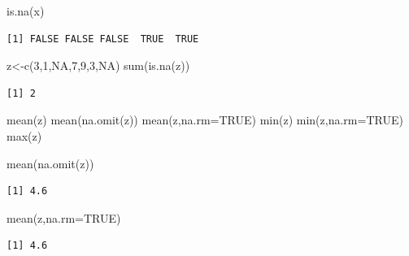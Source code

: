 \documentclass[
  ignorenonframetext,
  aspectratio=169,
  spanish,
]{beamer}
\newenvironment{Shaded}{\begin{snugshade}}{\end{snugshade}}
\newcommand{\AttributeTok}[1]{\textcolor[rgb]{0.40,0.45,0.13}{#1}}
\newcommand{\ConstantTok}[1]{\textcolor[rgb]{0.56,0.35,0.01}{#1}}
\newcommand{\DecValTok}[1]{\textcolor[rgb]{0.68,0.00,0.00}{#1}}
\newcommand{\FunctionTok}[1]{\textcolor[rgb]{0.28,0.35,0.67}{#1}}
\newcommand{\NormalTok}[1]{\textcolor[rgb]{0.00,0.23,0.31}{#1}}
\newcommand{\OtherTok}[1]{\textcolor[rgb]{0.00,0.23,0.31}{#1}}
\begin{document}
\begin{frame}[fragile]{}
\label{section-7}
\begin{Shaded}
\begin{Highlighting}[]
\FunctionTok{is.na}\NormalTok{(x)}
\end{Highlighting}
\end{Shaded}

\begin{verbatim}
[1] FALSE FALSE FALSE  TRUE  TRUE
\end{verbatim}

\begin{Shaded}
\begin{Highlighting}[]
\NormalTok{z}\OtherTok{\textless{}{-}}\FunctionTok{c}\NormalTok{(}\DecValTok{3}\NormalTok{,}\DecValTok{1}\NormalTok{,}\ConstantTok{NA}\NormalTok{,}\DecValTok{7}\NormalTok{,}\DecValTok{9}\NormalTok{,}\DecValTok{3}\NormalTok{,}\ConstantTok{NA}\NormalTok{)}
\FunctionTok{sum}\NormalTok{(}\FunctionTok{is.na}\NormalTok{(z))}
\end{Highlighting}
\end{Shaded}

\begin{verbatim}
[1] 2
\end{verbatim}
\end{frame}

\begin{frame}[fragile]{}
\label{section-8}
\begin{Shaded}
\begin{Highlighting}[]
\FunctionTok{mean}\NormalTok{(z)}
\FunctionTok{mean}\NormalTok{(}\FunctionTok{na.omit}\NormalTok{(z))}
\FunctionTok{mean}\NormalTok{(z,}\AttributeTok{na.rm=}\ConstantTok{TRUE}\NormalTok{)}
\FunctionTok{min}\NormalTok{(z)}
\FunctionTok{min}\NormalTok{(z,}\AttributeTok{na.rm=}\ConstantTok{TRUE}\NormalTok{)}
\FunctionTok{max}\NormalTok{(z)}
\end{Highlighting}
\end{Shaded}
\end{frame}

\begin{frame}[fragile]{}
\label{section-9}
\begin{Shaded}
\begin{Highlighting}[]
\FunctionTok{mean}\NormalTok{(}\FunctionTok{na.omit}\NormalTok{(z))}
\end{Highlighting}
\end{Shaded}

\begin{verbatim}
[1] 4.6
\end{verbatim}

\begin{Shaded}
\begin{Highlighting}[]
\FunctionTok{mean}\NormalTok{(z,}\AttributeTok{na.rm=}\ConstantTok{TRUE}\NormalTok{)}
\end{Highlighting}
\end{Shaded}

\begin{verbatim}
[1] 4.6
\end{verbatim}
\end{frame}
\end{document}
